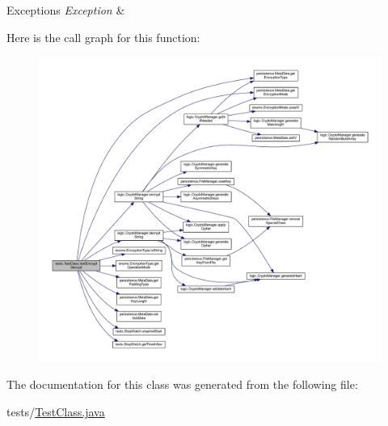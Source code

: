 \begin{DoxyExceptions}{Exceptions}
{\em Exception} & \\
\hline
\end{DoxyExceptions}
Here is the call graph for this function\+:
\nopagebreak
\begin{figure}[H]
\begin{center}
\leavevmode
\includegraphics[width=350pt]{classtests_1_1_test_class_a11145228e7254b6763247dcdb84d1805_cgraph}
\end{center}
\end{figure}


The documentation for this class was generated from the following file\+:\begin{DoxyCompactItemize}
\item 
tests/\mbox{\hyperlink{_test_class_8java}{Test\+Class.\+java}}\end{DoxyCompactItemize}

